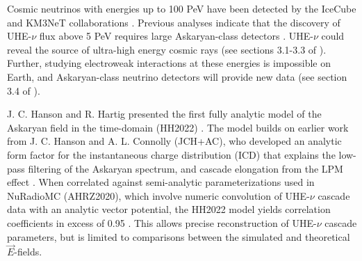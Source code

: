 \documentclass[amsmath,amssymb,aps,prd,10pt,twocolumn,showkeys]{revtex4}
\begin{document}
Cosmic neutrinos with energies up to 100 PeV have been detected by the IceCube and KM3NeT collaborations \cite{10.1126/science.1242856,aartsen2013first-bff,collaboration2016observation-03b,collaboration2018neutrino-2a0,collaboration2021detection-6fa,collaboration2022evidence-a08,collaboration2023observation-08b,collaboration2025observation-22f}. Previous analyses indicate that the discovery of UHE-$\nu$ flux above 5 PeV requires large Askaryan-class detectors \cite{10.1103/physrevd.98.062003}.  UHE-$\nu$ could reveal the source of ultra-high energy cosmic rays (see sections 3.1-3.3 of \cite{10.48550/arxiv.2008.04323}).  Further, studying electroweak interactions at these energies is impossible on Earth, and Askaryan-class neutrino detectors will provide new data (see section 3.4 of \cite{10.48550/arxiv.2008.04323}).

J. C. Hanson and R. Hartig presented the first fully analytic model of the Askaryan field in the time-domain (HH2022) \cite{PhysRevD.105.123019}.  The model builds on earlier work from J. C. Hanson and A. L. Connolly (JCH+AC), who developed an analytic form factor for the instantaneous charge distribution (ICD) that explains the low-pass filtering of the Askaryan spectrum, and cascade elongation from the LPM effect \cite{10.1016/j.astropartphys.2017.03.008}.  When correlated against semi-analytic parameterizations used in NuRadioMC (AHRZ2020), which involve numeric convolution of UHE-$\nu$ cascade data with an analytic vector potential, the HH2022 model yields correlation coefficients in excess of 0.95 \cite{PhysRevD.101.083005,PhysRevD.105.123019}.  This allows precise reconstruction of UHE-$\nu$ cascade parameters, but is limited to comparisons between the simulated and theoretical $\vec{E}$-fields.
\end{document}
